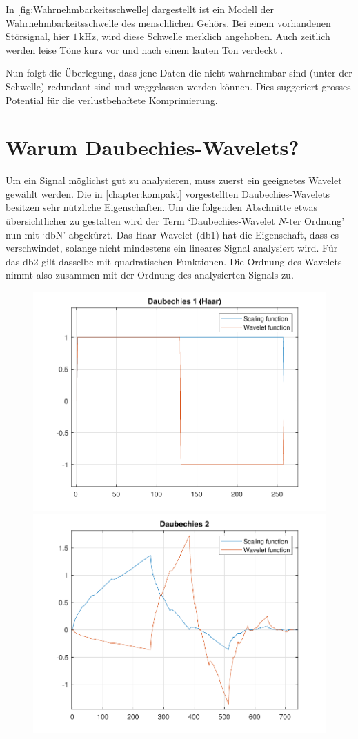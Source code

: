 \begin{refsection}
In \autoref{fig:Wahrnehmbarkeitsschwelle} dargestellt ist ein Modell der Wahrnehmbarkeitsschwelle des menschlichen Gehörs.
Bei einem vorhandenen Störsignal, hier $1\,\text{kHz}$, wird diese Schwelle merklich angehoben.
Auch zeitlich werden leise Töne kurz vor und nach einem lauten Ton verdeckt \cite{wikipedia:Psychoakustik}.

Nun folgt die Überlegung, dass jene Daten die nicht wahrnehmbar sind (unter der Schwelle) redundant sind und weggelassen werden können.
Dies suggeriert grosses Potential für die verlustbehaftete Komprimierung.

\section{Warum Daubechies-Wavelets?}
\label{chapter:daubechies}
Um ein Signal möglichst gut zu analysieren, muss zuerst ein geeignetes Wavelet gewählt werden.
Die in \autoref{chapter:kompakt} vorgestellten Daubechies-Wavelets besitzen sehr nützliche Eigenschaften.
Um die folgenden Abschnitte etwas übersichtlicher zu gestalten wird der Term `Daubechies-Wavelet $N$-ter Ordnung' nun mit `dbN' abgekürzt.
Das Haar-Wavelet (db1) hat die Eigenschaft, dass es verschwindet, solange nicht mindestens ein lineares Signal analysiert wird.
Für das db2 gilt dasselbe mit quadratischen Funktionen. 
Die Ordnung des Wavelets nimmt also zusammen mit der Ordnung des analysierten Signals zu.
\begin{figure}
	\includegraphics[width=0.5\linewidth]{papers/compress/Bilder/db1}
	\includegraphics[width=0.5\linewidth]{papers/compress/Bilder/db2}

\end{figure}
\end{refsection}

